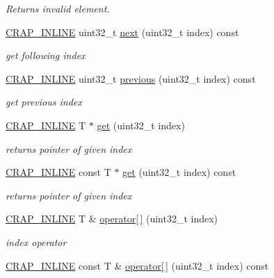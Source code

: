 \begin{DoxyCompactItemize}
\begin{DoxyCompactList}\small\item\em Returns invalid element. \end{DoxyCompactList}\item 
\hyperlink{config__x86_8h_a5a40526b8d842e7ff731509998bb0f1c}{C\+R\+A\+P\+\_\+\+I\+N\+L\+I\+N\+E} uint32\+\_\+t \hyperlink{classcrap_1_1tree_a252cf850824ac3347b6d5ae78095f3ce}{next} (uint32\+\_\+t index) const 
\begin{DoxyCompactList}\small\item\em get following index \end{DoxyCompactList}\item 
\hyperlink{config__x86_8h_a5a40526b8d842e7ff731509998bb0f1c}{C\+R\+A\+P\+\_\+\+I\+N\+L\+I\+N\+E} uint32\+\_\+t \hyperlink{classcrap_1_1tree_a465307512e44daba7b36516e6ea59ffd}{previous} (uint32\+\_\+t index) const 
\begin{DoxyCompactList}\small\item\em get previous index \end{DoxyCompactList}\item 
\hyperlink{config__x86_8h_a5a40526b8d842e7ff731509998bb0f1c}{C\+R\+A\+P\+\_\+\+I\+N\+L\+I\+N\+E} T $\ast$ \hyperlink{classcrap_1_1tree_af82cf9d34ce86a6bdc091e0f1c8e7cdc}{get} (uint32\+\_\+t index)
\begin{DoxyCompactList}\small\item\em returns pointer of given index \end{DoxyCompactList}\item 
\hyperlink{config__x86_8h_a5a40526b8d842e7ff731509998bb0f1c}{C\+R\+A\+P\+\_\+\+I\+N\+L\+I\+N\+E} const T $\ast$ \hyperlink{classcrap_1_1tree_aeb4f71991ee540cfe0bdb26e2f2d6a48}{get} (uint32\+\_\+t index) const 
\begin{DoxyCompactList}\small\item\em returns pointer of given index \end{DoxyCompactList}\item 
\hyperlink{config__x86_8h_a5a40526b8d842e7ff731509998bb0f1c}{C\+R\+A\+P\+\_\+\+I\+N\+L\+I\+N\+E} T \& \hyperlink{classcrap_1_1tree_a7a9fe0ff4d09686681d108ad1809f928}{operator\mbox{[}$\,$\mbox{]}} (uint32\+\_\+t index)
\begin{DoxyCompactList}\small\item\em index operator \end{DoxyCompactList}\item 
\hyperlink{config__x86_8h_a5a40526b8d842e7ff731509998bb0f1c}{C\+R\+A\+P\+\_\+\+I\+N\+L\+I\+N\+E} const T \& \hyperlink{classcrap_1_1tree_ad1df504f38a87fc16b9d74ed871f699e}{operator\mbox{[}$\,$\mbox{]}} (uint32\+\_\+t index) const 

\end{DoxyCompactItemize}
